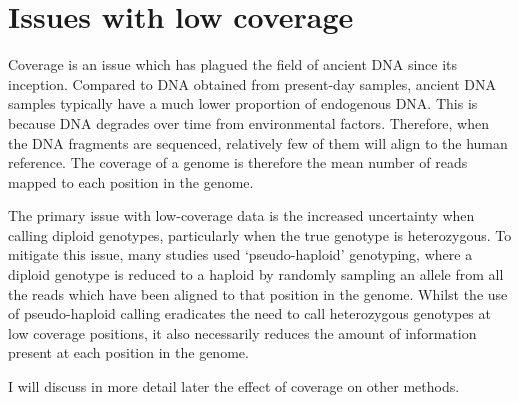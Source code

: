 \section{Issues with low coverage}

Coverage is an issue which has plagued the field of ancient DNA since its inception. Compared to DNA obtained from present-day samples, ancient DNA samples typically have a much lower proportion of endogenous DNA. This is because DNA degrades over time from environmental factors. Therefore, when the DNA fragments are sequenced, relatively few of them will align to the human reference. The coverage of a genome is therefore the mean number of reads mapped to each position in the genome. 

The primary issue with low-coverage data is the increased uncertainty when calling diploid genotypes, particularly when the true genotype is heterozygous. To mitigate this issue, many studies used `pseudo-haploid' genotyping, where a diploid genotype is reduced to a haploid by randomly sampling an allele from all the reads which have been aligned to that position in the genome. Whilst the use of pseudo-haploid calling eradicates the need to call heterozygous genotypes at low coverage positions, it also necessarily reduces the amount of information present at each position in the genome.

I will discuss in more detail later the effect of coverage on other methods. 
 
